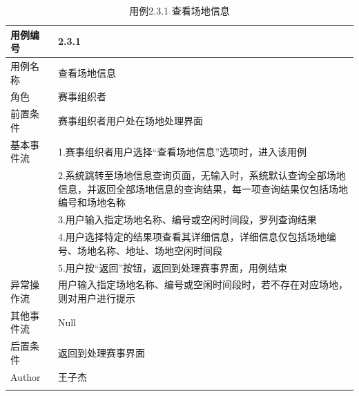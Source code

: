 \documentclass[a4paper,UTF8]{article}
\begin{document}
\begin{table}[H]
	\begin{center}
		\caption{用例2.3.1 查看场地信息}
		\label{table:Tab_uc231}
		\begin{tabular}{|p{}|p{}|}
			\hline\noalign{\smallskip}
			用例编号 & 2.3.1\\
			\hline
			用例名称 &  查看场地信息\\
			\hline
			角色 & 赛事组织者\\
			\hline
			前置条件 & 赛事组织者用户处在场地处理界面\\
			\hline
			基本事件流 & 1.赛事组织者用户选择“查看场地信息”选项时，进入该用例 \\& 2.系统跳转至场地信息查询页面，无输入时，系统默认查询全部场地信息，并返回全部场地信息的查询结果，每一项查询结果仅包括场地编号和场地名称 \\& 3.用户输入指定场地名称、编号或空闲时间段，罗列查询结果 \\& 4.用户选择特定的结果项查看其详细信息，详细信息仅包括场地编号、场地名称、地址、场地空闲时间段 \\& 5.用户按“返回”按钮，返回到处理赛事界面，用例结束\\
			\hline
			异常操作流 & 用户输入指定场地名称、编号或空闲时间段时，若不存在对应场地，则对用户进行提示 \\
			\hline
			其他事件流 & Null \\
			\hline
			后置条件 & 返回到处理赛事界面\\
			\hline
			Author & 王子杰 \\
			\noalign{\smallskip}
			\hline
			\noalign{\smallskip}
		\end{tabular}
	\end{center}
\end{table}
			
\end{document}
